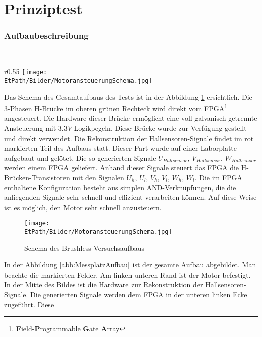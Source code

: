 \ifSTANDALONE
\section{Prinziptest}
\fi
\ifEMBED
\subsubsection{Aufbaubeschreibung}
    \BLDCcollab \\
\fi
\ifEMBED
    \begin{wrapfigure}{r}{0.55\textwidth}
       	\texttt{[image: \\EtPath/Bilder/MotoransteuerungSchema.jpg]}
       	\centering
       	\caption{Schema des Brushless-Versuchsaufbaus}
        \label{abb:MotoransteuerungSchema}
    \end{wrapfigure}
\fi
    Das Schema des Gesamtaufbaus des Tests ist in der Abbildung 
    \ref{abb:MotoransteuerungSchema} ersichtlich. Die 3-Phasen H-Brücke 
    im oberen grünen Rechteck wird direkt vom FPGA\footnote{\textbf{F}ield-\textbf{P}rogrammable \textbf{G}ate \textbf{A}rray} angesteuert. Die Hardware 
    dieser Brücke ermöglicht eine voll galvanisch getrennte Ansteuerung 
    mit $3.3 V$ Logikpegeln. Diese Brücke wurde zur Verfügung gestellt und direkt
    verwendet. Die Rekonstruktion der Hallsensoren-Signale findet im rot 
    markierten Teil des Aufbaus statt. Dieser Part wurde auf einer 
    Laborplatte aufgebaut und gelötet. Die so generierten Signale 
    $U_{Hallsensor}$, $V_{Hallsensor}$, $W_{Hallsensor}$ werden einem FPGA 
    geliefert. Anhand dieser Signale steuert das FPGA die 
    H-Brücken-Transistoren mit den Signalen $U_h$, $U_l$, $V_h$, $V_l$, 
    $W_h$, $W_l$. Die im FPGA enthaltene Konfiguration besteht aus simplen 
    AND-Verknüpfungen, die die anliegenden Signale sehr schnell und 
    effizient verarbeiten können. Auf diese Weise ist es möglich, den Motor sehr 
    schnell anzusteuern.
    \ifSTANDALONE
    \begin{figure}[h!]
    	\texttt{[image: \\EtPath/Bilder/MotoransteuerungSchema.jpg]}
       	\centering
       	\caption{Schema des Brushless-Versuchsaufbaus}
        \label{abb:MotoransteuerungSchema}
    \end{figure}
    \fi
    In der Abbildung \ref{abb:MessplatzAufbau} ist der gesamte Aufbau 
    abgebildet. Man beachte die markierten Felder. Am linken unteren Rand 
    ist der Motor befestigt. In der Mitte des Bildes ist die Hardware zur Rekonstruktion der Hallsensoren-Signale.
    Die generierten Signale werden dem FPGA in der unteren linken Ecke zugeführt. Diese 
